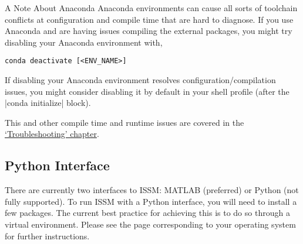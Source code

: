 \begin{calloutHighlight}{A Note About Anaconda}
Anaconda environments can cause all sorts of toolchain conflicts at configuration and compile time that are hard to diagnose. If you use Anaconda and are having issues compiling the external packages, you might try disabling your Anaconda environment with,
\begin{lstlisting}
conda deactivate [<ENV_NAME>]
\end{lstlisting}
If disabling your Anaconda environment resolves configuration/compilation issues, you might consider disabling it by default in your shell profile (after the \lstinlinebg|conda initialize| block).

This and other compile time and runtime issues are covered in the \hyperref[chap:troubleshooting]{`Troubleshooting' chapter}.
\end{calloutHighlight}

\subsection{Python Interface}
There are currently two interfaces to ISSM: MATLAB (preferred) or Python (not fully supported). To run ISSM with a Python interface, you will need to install a few packages. The current best practice for achieving this is to do so through a virtual environment. Please see the page corresponding to your operating system for further instructions.


